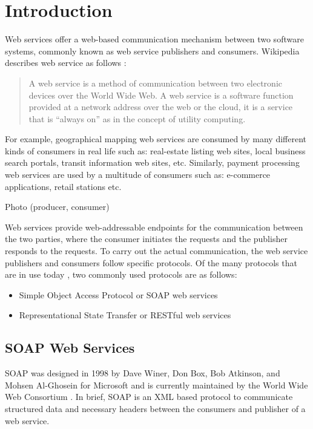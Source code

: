 \documentclass[runningheads,a4paper]{llncs}
\begin{document}
\section{Introduction}

Web services offer a web-based communication mechanism between two software systems, commonly known as web service publishers and consumers. Wikipedia describes web service as follows \cite{web_service_wiki}:

\begin{quote}
A web service is a method of communication between two electronic devices over the World Wide Web. A web service is a software function provided at a network address over the web or the cloud, it is a service that is ``always on'' as in the concept of utility computing.
\end{quote}

For example, geographical mapping web services are consumed by many different kinds of consumers in real life such as: real-estate listing web sites, local business search portals, transit information web sites, etc. Similarly, payment processing web services are used by a multitude of consumers such as: e-commerce applications, retail stations etc.

Photo (producer, consumer)


Web services provide web-addressable endpoints for the communication between the two parties, where the consumer initiates the requests and the publisher responds to the requests. To carry out the actual communication, the web service publishers and consumers follow specific protocols. Of the many protocols that are in use today \cite{web_service_protocols_wiki}, two commonly used protocols are as follows:

\begin{itemize}
  \item Simple Object Access Protocol or SOAP web services
  \item Representational State Transfer or RESTful web services
\end{itemize}


\subsection{SOAP Web Services} %
\label{sub:soap_web_services}
SOAP was designed in 1998 by Dave Winer, Don Box, Bob Atkinson, and Mohsen Al-Ghosein for Microsoft and is currently maintained by the World Wide Web Consortium \cite{soap_wiki}. In brief, SOAP is an XML based protocol to communicate structured data and necessary headers between the consumers and publisher of a web service.
\end{document}
